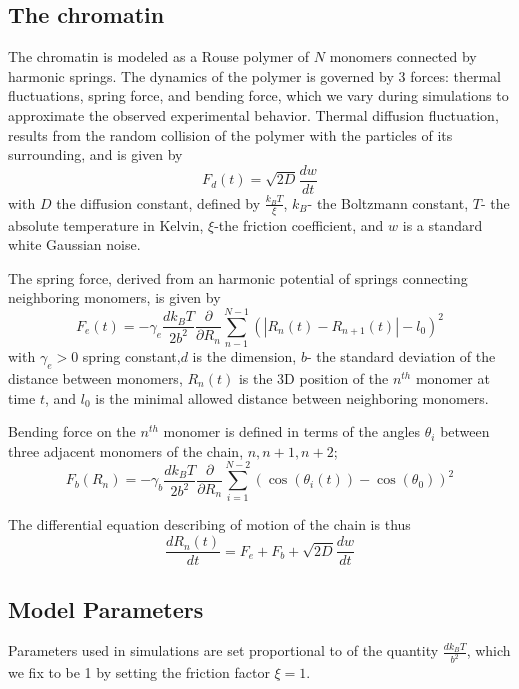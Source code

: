 \documentclass[12pt]{report}
\begin{document}
	\subsection{The chromatin}	
     The chromatin is modeled as a Rouse polymer of $N$ monomers connected by harmonic springs. The dynamics of the polymer is governed by 3 forces: thermal fluctuations, spring force, and bending force, which we vary during simulations to approximate the observed experimental behavior.
     Thermal diffusion fluctuation, results from the random collision of the polymer with the particles of its surrounding, and is given by 
     \begin{equation*}
     F_d(t) = \sqrt{2D}\frac{dw}{dt}
     \end{equation*}
      with $D$ the diffusion constant, defined by $\frac{k_BT}{\xi}$, $k_B$- the Boltzmann constant, $T$- the absolute temperature in Kelvin, $\xi$-the friction coefficient, and $w$ is a standard white Gaussian noise. 
            
     The spring force, derived from an harmonic potential of springs connecting neighboring monomers, is given by
     \begin{equation*}
      F_e(t) = -\gamma_e\frac{dk_BT}{2b^2}\frac{\partial}{\partial R_n}\sum_{n-1}^{N-1}(|R_n(t)-R_{n+1}(t)| -l_0)^2
     \end{equation*}
     with $\gamma_e>0$ spring constant,$d$ is the dimension, $b$- the standard deviation of the distance between monomers, $R_n(t)$ is the 3D position of the $n^{th}$ monomer at time $t$, and $l_0$ is the minimal allowed distance between neighboring monomers.
     
     Bending force on the $n^{th}$ monomer is defined in terms of the angles $\theta_i$ between three adjacent monomers of the chain, $n,n+1,n+2$;
     \begin{equation*}
     F_b(R_n) = -\gamma_b\frac{dk_BT}{2b^2}\frac{\partial}{\partial R_n}\sum_{i=1}^{N-2}(\cos(\theta_i(t))-\cos(\theta_0))^2
     \end{equation*}
               
     The differential equation describing of motion of the chain is thus 
     \begin{equation*}
     \frac{dR_n(t)}{dt}= F_e +F_b +\sqrt{2D} \frac{dw}{dt}     
     \end{equation*}
     
    \subsection{Model Parameters}
      Parameters used in simulations are set proportional to of the quantity $\frac{dk_BT}{b^2}$, which we fix to be 1 by setting the friction factor $\xi=1$. 
\end{document}
